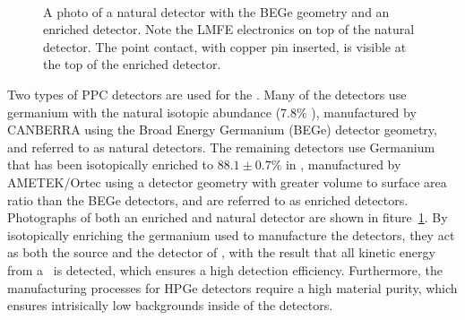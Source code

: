 \documentclass[/main.tex]{subfiles}
\begin{document}
\begin{figure}[h]
  \centering
  ~
  \caption[Natural and enriched detector photos]{\label{fig:detphotos}
    A photo of a natural detector with the BEGe geometry and an enriched detector. Note the LMFE electronics on top of the natural detector. The point contact, with copper pin inserted, is visible at the top of the enriched detector.
  }
\end{figure}
Two types of PPC detectors are used for the \MJD.
Many of the detectors use germanium with the natural isotopic abundance (7.8\% ), manufactured by CANBERRA using the Broad Energy Germanium (BEGe) detector geometry, and referred to as natural detectors.
The remaining detectors use Germanium that has been isotopically enriched to $88.1\pm0.7\%$ in , manufactured by AMETEK/Ortec using a detector geometry with greater volume to surface area ratio than the BEGe detectors, and are referred to as enriched detectors.
Photographs of both an enriched and natural detector are shown in fiture~\ref{fig:detphotos}.
By isotopically enriching the germanium used to manufacture the detectors, they act as both the source and the detector of \znbb, with the result that all kinetic energy from a \znbb\ is detected, which ensures a high detection efficiency.
Furthermore, the manufacturing processes for HPGe detectors require a high material purity, which ensures intrisically low backgrounds inside of the detectors.
\end{document}

